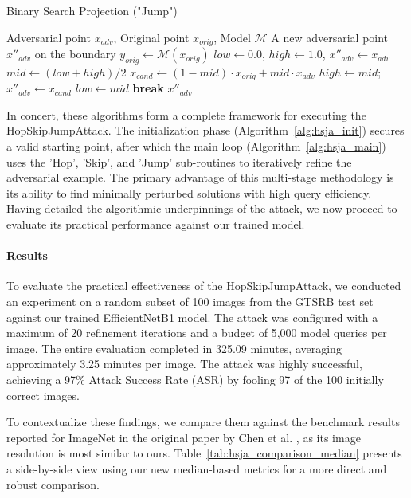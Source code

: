 \documentclass[../main.tex]{subfiles}
\begin{document}
\begin{breakablealgorithm}{Binary Search Projection ("Jump")}
\label{alg:hsja_jump}
\begin{algorithmic}[1]
\Require Adversarial point $x_{adv}$, Original point $x_{orig}$, Model $\mathcal{M}$
\Ensure A new adversarial point $x''_{adv}$ on the boundary
\State $y_{orig} \gets \mathcal{M}(x_{orig})$
\State $low \gets 0.0$, $high \gets 1.0$, $x''_{adv} \gets x_{adv}$
    \State $mid \gets (low + high) / 2$
    \State $x_{cand} \gets (1 - mid) \cdot x_{orig} + mid \cdot x_{adv}$
        \State $high \gets mid$; \quad $x''_{adv} \gets x_{cand}$
    \Else
        \State $low \gets mid$
    \EndIf
     \textbf{break} \EndIf
\EndFor
\State \Return $x''_{adv}$
\end{algorithmic}
\end{breakablealgorithm}

    In concert, these algorithms form a complete framework for executing the HopSkipJumpAttack. The initialization phase (Algorithm~\ref{alg:hsja_init}) secures a valid starting point, after which the main loop (Algorithm~\ref{alg:hsja_main}) uses the 'Hop', 'Skip', and 'Jump' sub-routines to iteratively refine the adversarial example. The primary advantage of this multi-stage methodology is its ability to find minimally perturbed solutions with high query efficiency. Having detailed the algorithmic underpinnings of the attack, we now proceed to evaluate its practical performance against our trained model.

\paragraph{Results}
To evaluate the practical effectiveness of the HopSkipJumpAttack, we conducted an experiment on a random subset of 100 images from the GTSRB test set against our trained EfficientNetB1 model. The attack was configured with a maximum of 20 refinement iterations and a budget of 5,000 model queries per image. The entire evaluation completed in 325.09 minutes, averaging approximately 3.25 minutes per image. The attack was highly successful, achieving a 97\% Attack Success Rate (ASR) by fooling 97 of the 100 initially correct images.

To contextualize these findings, we compare them against the benchmark results reported for ImageNet in the original paper by Chen et al. \cite{chen2020hopskipjumpattackqueryefficientdecisionbasedattack}, as its image resolution is most similar to ours. Table~\ref{tab:hsja_comparison_median} presents a side-by-side view using our new median-based metrics for a more direct and robust comparison.
\end{document}
